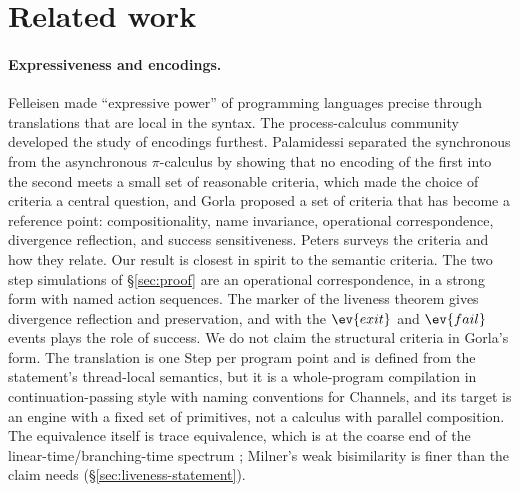 \section{Related work}
\label{sec:related}

\paragraph{Expressiveness and encodings.}
Felleisen \cite{felleisen1991expressive} made ``expressive power'' of
programming languages precise through translations that are local in the
syntax. The process-calculus community developed the study of encodings
furthest. Palamidessi \cite{palamidessi2003comparing} separated the
synchronous from the asynchronous $\pi$-calculus by showing that no
encoding of the first into the second meets a small set of reasonable
criteria, which made the choice of criteria a central question, and Gorla
\cite{gorla2010unified} proposed a set of criteria that has become a
reference point: compositionality, name invariance, operational
correspondence, divergence reflection, and success sensitiveness. Peters
\cite{peters2019comparing} surveys the criteria and how they relate. Our
result is closest in spirit to the semantic criteria. The two step
simulations of \S\ref{sec:proof} are an operational correspondence, in a
strong form with named action sequences. The \mdiv{} marker of the liveness
theorem gives divergence reflection and preservation, and \mterm{} with the
$\ev{exit}$ and $\ev{fail}$ events plays the role of success. We do not
claim the structural criteria in Gorla's form. The translation is one Step
per program point and is defined from the statement's thread-local semantics,
but it is a whole-program compilation in continuation-passing style
\cite{appel1992cps} with naming conventions for Channels, and its target is
an engine with a fixed set of primitives, not a calculus with parallel
composition. The equivalence itself is trace equivalence, which is at the
coarse end of the linear-time/branching-time spectrum
\cite{vanglabbeek2001spectrum}; Milner's weak bisimilarity
\cite{milner1989communication} is finer than the claim needs
(\S\ref{sec:liveness-statement}).

